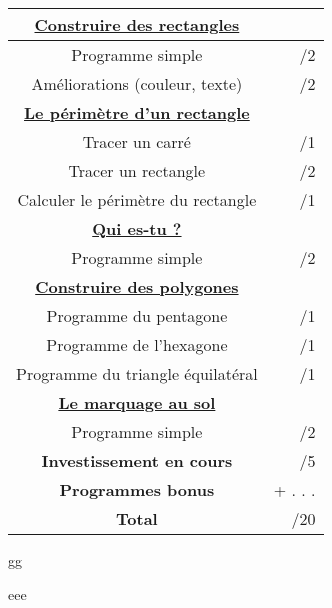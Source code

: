 \documentclass[a4paper,11pt]{article}
\begin{document}
\begin{tabular}{|c|r|}
\hline 
\textbf{\underline{Construire des rectangles}} &  \\ 
\hline 
Programme simple & /2 \\ 
\hline 
Améliorations (couleur, texte) & /2 \\ 
\hline 
\textbf{\underline{Le périmètre d'un rectangle}} &  \\ 
\hline 
Tracer un carré & /1 \\ 
\hline 
Tracer un rectangle & /2 \\ 
\hline 
Calculer le périmètre du rectangle & /1 \\ 
\hline
\textbf{\underline{Qui es-tu ?}} &  \\ 
\hline 
Programme simple & /2 \\ 
\hline 
\textbf{\underline{Construire des polygones}} & \\ 
\hline 
Programme du pentagone & /1 \\ 
\hline 
Programme de l'hexagone & /1 \\ 
\hline 
Programme du triangle équilatéral & /1 \\ 
\hline 
\textbf{\underline{Le marquage au sol}} &  \\ 
\hline 
Programme simple & /2 \\ 
\hline 
\textbf{Investissement en cours} & /5 \\ 
\hline 
\textbf{Programmes bonus} & + . . . \\ 
\hline 
\textbf{Total} & /20\\ 
\hline 

\end{tabular} 


gg

eee
\end{document}
